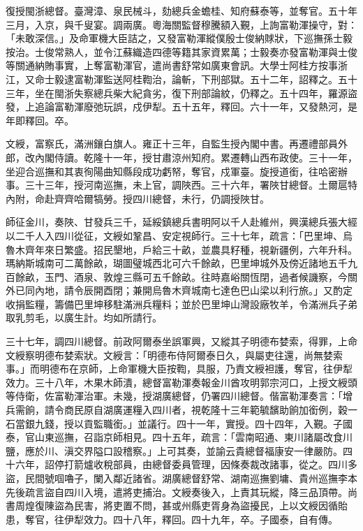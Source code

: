 \begin{pinyinscope}
復授閩浙總督。臺灣漳、泉民械斗，劾總兵金蟾桂、知府蘇泰等，並奪官。五十年三月，入京，與千叟宴。調兩廣。粵海關監督穆騰額入覲，上詢富勒渾操守，對：「未敢深信。」及命軍機大臣詰之，又發富勒渾縱僕殷士俊納賕狀，下巡撫孫士毅按治。士俊常熟人，並令江蘇織造四德等籍其家資累萬；士毅奏亦發富勒渾與士俊等關通納賄事實，上奪富勒渾官，遣尚書舒常如廣東會訊。大學士阿桂方按事浙江，又命士毅逮富勒渾監送阿桂鞫治，論斬，下刑部獄。五十二年，詔釋之。五十三年，坐在閩浙失察總兵柴大紀貪劣，復下刑部論紋，仍釋之。五十四年，羅源盜發，上追論富勒渾廢弛玩誤，戍伊犁。五十五年，釋回。六十一年，又發熱河，是年即釋回。卒。

文綬，富察氏，滿洲鑲白旗人。雍正十三年，自監生授內閣中書。再遷禮部員外郎，改內閣侍讀。乾隆十一年，授甘肅涼州知府。累遷轉山西布政使。三十一年，坐迎合巡撫和其衷徇陽曲知縣段成功虧帑，奪官，戍軍臺。旋授道銜，往哈密辦事。三十三年，授河南巡撫，未上官，調陜西。三十六年，署陜甘總督。土爾扈特內附，命赴齊齊哈爾犒勞。授四川總督，未行，仍調授陜甘。

師征金川，奏陜、甘發兵三千，延綏鎮總兵書明阿以千人赴維州，興漢總兵張大經以二千人入四川從征，文綬如鞏昌、安定視師行。三十七年，疏言：「巴里坤、烏魯木齊年來日繁盛。招民墾地，戶給三十畝，並農具籽種，視新疆例，六年升科。瑪納斯城南可二萬餘畝，瑚圖璧城西北可六千餘畝，巴里坤城外及傍近諸地五千九百餘畝，玉門、酒泉、敦煌三縣可五千餘畝。往時嘉峪關恆閉，過者候譏察，今關外已同內地，請令辰開酉閉；兼開烏魯木齊城南七達色巴山梁以利行旅。」又酌定收捐監糧，籌備巴里坤移駐滿洲兵糧料；並於巴里坤山灣設廠牧羊，令滿洲兵子弟取乳剪毛，以廣生計。均如所請行。

三十七年，調四川總督。前政阿爾泰坐誤軍興，又縱其子明德布婪索，得罪，上命文綬察明德布婪索狀。文綬言：「明德布侍阿爾泰日久，與屬吏往還，尚無婪索事。」而明德布在京師，上命軍機大臣按鞫，具服，乃責文綬袒護，奪官，往伊犁效力。三十八年，木果木師潰，總督富勒渾奏報金川酋攻明郭宗河口，上授文綬頭等侍衛，佐富勒渾治軍。未幾，授湖廣總督，仍署四川總督。偕富勒渾奏言：「增兵需餉，請令商民原自湖廣運糧入四川者，視乾隆十三年範毓馪助餉加銜例，穀一石當銀九錢，授以貢監職銜。」並議行。四十一年，實授。四十四年，入覲。子國泰，官山東巡撫，召詣京師相見。四十五年，疏言：「雲南昭通、東川諸屬改食川鹽，應於川、滇交界隘口設稽察。」上可其奏，並諭云貴總督福康安一律嚴防。四十六年，詔停打箭爐收稅部員，由總督委員管理，因條奏裁改諸事，從之。四川多盜，民間號啯嚕子，闌入鄰近諸省。湖廣總督舒常、湖南巡撫劉墉、貴州巡撫李本先後疏言盜自四川入境，遣將吏捕治。文綬奏後入，上責其玩縱，降三品頂帶。尚書周煌復陳盜為民害，將吏置不問，甚或州縣吏胥身為盜擾民，上以文綬因循貽患，奪官，往伊犁效力。四十八年，釋回。四十九年，卒。子國泰，自有傳。


\end{pinyinscope}
